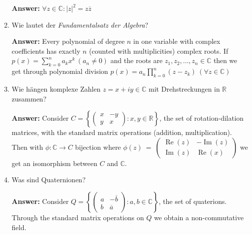 \documentclass[11pt]{article}
\newcommand{\abs}[1]{\left|#1\right|}
\newcommand{\sumn}[4]{\sum_{#1=#2}^{#3}{#4}}
\newcommand{\RR}[0]{\mathbb{R}}
\newcommand{\CC}[0]{\mathbb{C}}
\renewcommand{\Re}[0]{\operatorname{Re}}
\renewcommand{\Im}[0]{\operatorname{Im}}
\begin{document}
\begin{enumerate}
    \textbf{Answer:} $\forall z \in \CC\colon \abs{z}^2 = z \overline{z}$

    \item Wie lautet der \textit{Fundamentalsatz der Algebra}?

    \textbf{Answer:} Every polynomial of degree $n$ in one variable with complex coefficients has exactly $n$ (counted with multiplicities) complex roots. If $p(x) = \sumn{k}{0}{n}{a_k x^k}~(a_n \neq 0)$ and the roots are $z_1, z_2, \dots, z_n \in \CC$ then we get through polynomial division $p(x) = a_n \prod_{k=0}^n(z - z_k)~(\forall z\in \CC)$

    \item Wie hängen komplexe Zahlen $z = x + iy \in \CC$ mit Drehstreckungen in $\RR$ zusammen?

    \textbf{Answer:} Consider $C = \left\{\left(\begin{array}{cc}x&-y\\y&x\end{array}\right)\colon x,y \in \RR \right\}$, the set of rotation-dilation matrices, with the standard matrix operations (addition, multiplication). Then with $\phi\colon\CC \to C$ bijection where $\phi(z)~=~\left(\begin{array}{cc}\Re(z)&-\Im(z)\\\Im(z)&\Re(x)\end{array}\right)$ we get an isomorphism between $C$ and $\CC$.

    \item Was sind Quaternionen?

    \textbf{Answer:} Consider $Q = \left\{\left(\begin{array}{cc}a&-\overline{b}\\b&\overline{a}\end{array}\right)\colon a, b \in \CC \right\}$, the set of quaterions. Through the standard matrix operations on $Q$ we obtain a non-commutative field.


\end{enumerate}
\end{document}
